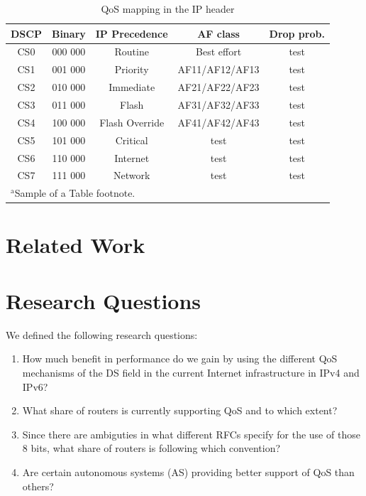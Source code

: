 \documentclass[conference]{IEEEtran}
\begin{document}
\begin{table}[htbp]
\caption{QoS mapping in the IP header}
\begin{center}
\begin{tabular}{|c|c|c|c|c|}
\hline
\textbf{DSCP}& \textbf{Binary} & \textbf{IP Precedence} & \textbf{AF class} & \textbf{Drop prob.} \\
\hline
CS0 & 000 000 & Routine & Best effort & test  \\
CS1 & 001 000 & Priority & AF11/AF12/AF13 & test \\
CS2 & 010 000 & Immediate & AF21/AF22/AF23 & test \\
CS3 & 011 000 & Flash & AF31/AF32/AF33 & test \\
CS4 & 100 000 & Flash Override & AF41/AF42/AF43 & test \\
CS5 & 101 000 & Critical & test & test \\
CS6 & 110 000 & Internet & test & test \\
CS7 & 111 000 & Network & test & test \\

\hline
\multicolumn{4}{l}{$^{\mathrm{a}}$Sample of a Table footnote.}
\end{tabular}
\label{tab1:DSCP-categories}
\end{center}
\end{table}

\section{Related Work}



\section{Research Questions}

We defined the following research questions:

\begin{enumerate}

\item How much benefit in performance do we gain by using the different QoS mechanisms of the DS field in the current Internet infrastructure in IPv4 and IPv6?
\item What share of routers is currently supporting QoS and to which extent?
\item Since there are ambiguties in what different RFCs specify for the use of those 8 bits, what share of routers is following which convention?
\item Are certain autonomous systems (AS) providing better support of QoS than others?

\end{enumerate}
\end{document}
